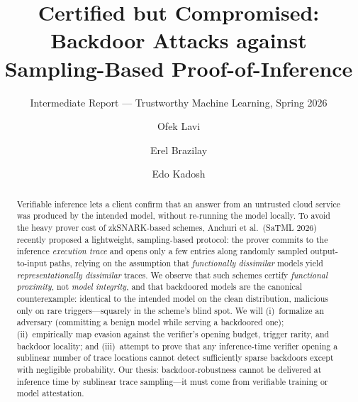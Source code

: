 \documentclass[sigconf,nonacm]{acmart}
\begin{document}
\title{Certified but Compromised: Backdoor Attacks against Sampling-Based Proof-of-Inference}
\subtitle{Intermediate Report --- Trustworthy Machine Learning, Spring 2026}

\author{Ofek Lavi}

\author{Erel Brazilay}

\author{Edo Kadosh}

\begin{abstract}
Verifiable inference lets a client confirm that an answer from an untrusted cloud service
was produced by the intended model, without re-running the model locally. To avoid the
heavy prover cost of zkSNARK-based schemes, Anchuri et al.\ (SaTML 2026) recently proposed
a lightweight, sampling-based protocol: the prover commits to the inference \emph{execution
trace} and opens only a few entries along randomly sampled output-to-input paths, relying on
the assumption that \emph{functionally dissimilar} models yield \emph{representationally
dissimilar} traces. We observe that such schemes certify \emph{functional proximity}, not
\emph{model integrity}, and that backdoored models are the canonical counterexample:
identical to the intended model on the clean distribution, malicious only on rare
triggers---squarely in the scheme's blind spot. We will (i)~formalize an adversary
(committing a benign model while serving a backdoored one);
(ii)~empirically map evasion against the verifier's opening budget, trigger rarity, and
backdoor locality; and (iii)~attempt to prove that any inference-time verifier opening a sublinear
number of trace locations cannot detect sufficiently sparse backdoors except with negligible
probability. Our thesis: backdoor-robustness cannot be delivered at inference time by sublinear trace
sampling---it must come from verifiable training or model attestation.
\end{abstract}


\maketitle
\end{document}
